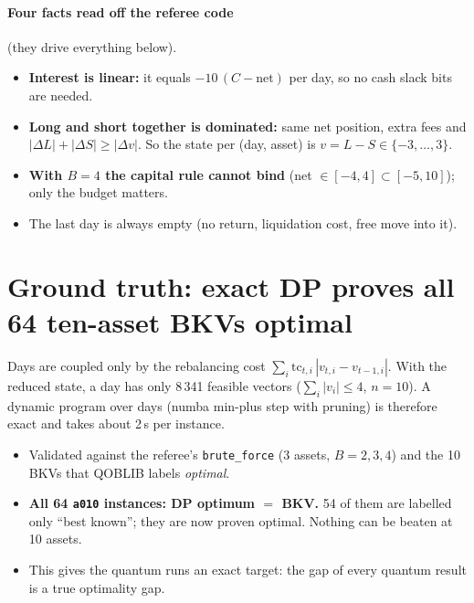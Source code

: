 \documentclass[11pt]{article}
\begin{document}
\paragraph{Four facts read off the referee code} (they drive everything below).
\begin{itemize}
\item \textbf{Interest is linear:} it equals $-10\,(C-\text{net})$ per day, so no cash slack bits are needed.
\item \textbf{Long and short together is dominated:} same net position, extra fees and
  $|\Delta L|+|\Delta S|\ge|\Delta v|$. So the state per (day, asset) is $v=L-S\in\{-3,\dots,3\}$.
\item \textbf{With $B=4$ the capital rule cannot bind} (net $\in[-4,4]\subset[-5,10]$); only the budget matters.
\item The last day is always empty (no return, liquidation cost, free move into it).
\end{itemize}

\section{Ground truth: exact DP proves all 64 ten-asset BKVs optimal}
Days are coupled only by the rebalancing cost $\sum_i \mathrm{tc}_{t,i}\,|v_{t,i}-v_{t-1,i}|$. With
the reduced state, a day has only 8\,341 feasible vectors ($\sum_i|v_i|\le4$, $n=10$). A dynamic
program over days (numba min-plus step with pruning) is therefore exact and takes about 2\,s per instance.
\begin{itemize}
\item Validated against the referee's \texttt{brute\_force} (3 assets, $B=2,3,4$) and the 10 BKVs that
  QOBLIB labels \emph{optimal}.
\item \textbf{All 64 \texttt{a010} instances: DP optimum $=$ BKV.} 54 of them are labelled only
  ``best known''; they are now proven optimal. Nothing can be beaten at 10 assets.
\item This gives the quantum runs an exact target: the gap of every quantum result is a true optimality gap.
\end{itemize}

\end{document}

